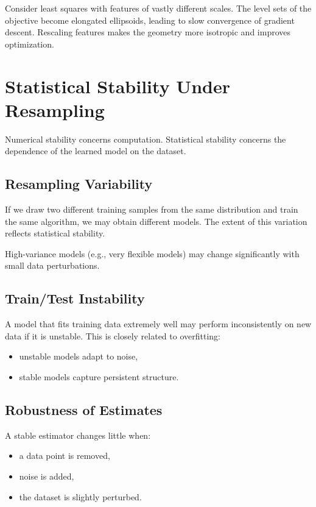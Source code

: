 Consider least squares with features of vastly different scales. The level sets of the objective become elongated ellipsoids, leading to slow convergence of gradient descent. Rescaling features makes the geometry more isotropic and improves optimization.

\section{Statistical Stability Under Resampling}

Numerical stability concerns computation. Statistical stability concerns the dependence of the learned model on the dataset.

\subsection{Resampling Variability}

If we draw two different training samples from the same distribution and train the same algorithm, we may obtain different models. The extent of this variation reflects statistical stability.

High-variance models (e.g., very flexible models) may change significantly with small data perturbations.

\subsection{Train/Test Instability}

A model that fits training data extremely well may perform inconsistently on new data if it is unstable. This is closely related to overfitting:
\begin{itemize}
    \item unstable models adapt to noise,
    \item stable models capture persistent structure.
\end{itemize}

\subsection{Robustness of Estimates}

A stable estimator changes little when:
\begin{itemize}
    \item a data point is removed,
    \item noise is added,
    \item the dataset is slightly perturbed.
\end{itemize}

